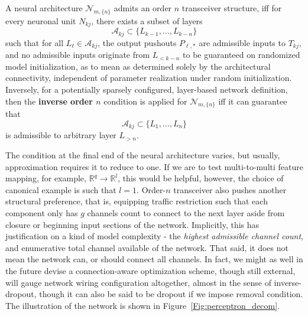 \begin{definition}
    A neural architecture $\mathcal{N}_{m,\{n\}}$ admits an order $n$ transceiver structure, iff for every neuronal unit $N_{kj}$, there exists a subset of layers
    \begin{equation}
        \mathcal{A}_{kj}\subset \{L_{k-1},\dots,L_{k-n}\}
    \end{equation}
    such that for all $L_{\ell}\in\mathcal{A}_{kj}$, the output pushouts $P_{\ell,*}$ are admissible inputs to $T_{kj}$, and no admissible inputs originate from $L_{<k-n}$ to be guaranteed on randomized model initialization, as to mean as determined solely by the architectural connectivity, independent of parameter realization under random initialization. Inversely, for a potentially sparsely configured, layer-based network definition, then the \textbf{inverse order $n$} condition is applied for $\mathcal{N}_{m,\{n\}}$ iff it can guarantee that 
    \begin{equation}
        \mathcal{A}_{kj}\subset \{L_{1},\dots,L_{n}\}
    \end{equation}
    is admissible to arbitrary layer $L_{>n}$. 
\end{definition}
The condition at the final end of the neural architecture varies, but usually, approximation requires it to reduce to one. If we are to test multi-to-multi feature mapping, for example, $\mathbb{R}^{q}\to\mathbb{R}^{l}$, this would be helpful, however, the choice of canonical example is such that $l=1$. Order-$n$ transceiver also pushes another structural preference, that is, equipping traffic restriction such that each component only has $g$ channels count to connect to the next layer aside from closure or beginning input sections of the network. Implicitly, this has justification on a kind of model complexity - the \textit{highest admissible channel count}, and enumerative total channel available of the network. That said, it does not mean the network can, or should connect all channels. In fact, we might as well in the future devise a connection-aware optimization scheme, though still external, will gauge network wiring configuration altogether, almost in the sense of inverse-dropout, though it can also be said to be dropout if we impose removal condition. The illustration of the network is shown in Figure~\ref{Fig:perceptron_decom}. 
